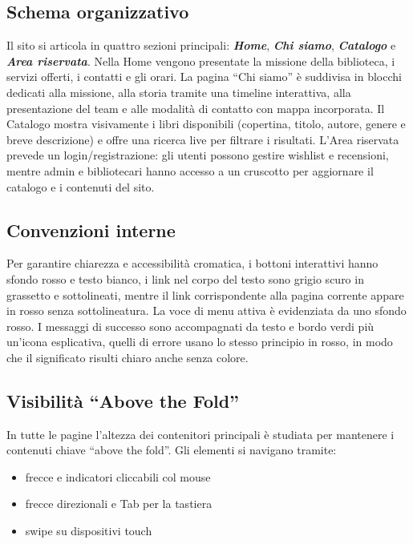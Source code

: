 \documentclass{article}
\begin{document}
\subsection{Schema organizzativo}
Il sito si articola in quattro sezioni principali: \emph{\textbf{Home}}, \emph{\textbf{Chi siamo}}, \emph{\textbf{Catalogo}} e \emph{\textbf{Area riservata}}.  
Nella Home vengono presentate la missione della biblioteca, i servizi offerti, i contatti e gli orari.  
La pagina “Chi siamo” è suddivisa in blocchi dedicati alla missione, alla storia tramite una timeline interattiva, alla presentazione del team e alle modalità di contatto con mappa incorporata.  
Il Catalogo mostra visivamente i libri disponibili (copertina, titolo, autore, genere e breve descrizione) e offre una ricerca live per filtrare i risultati.  
L’Area riservata prevede un login/registrazione: gli utenti possono gestire wishlist e recensioni, mentre admin e bibliotecari hanno accesso a un cruscotto per aggiornare il catalogo e i contenuti del sito.

\subsection{Convenzioni interne}
Per garantire chiarezza e accessibilità cromatica, i bottoni interattivi hanno sfondo rosso e testo bianco, i link nel corpo del testo sono grigio scuro in grassetto e sottolineati, mentre il link corrispondente alla pagina corrente appare in rosso senza sottolineatura. La voce di menu attiva è evidenziata da uno sfondo rosso. I messaggi di successo sono accompagnati da testo e bordo verdi più un’icona esplicativa, quelli di errore usano lo stesso principio in rosso, in modo che il significato risulti chiaro anche senza colore.

\subsection{Visibilità “Above the Fold”}
In tutte le pagine l’altezza dei contenitori principali è studiata per mantenere i contenuti chiave “above the fold”. Gli elementi si navigano tramite:
\begin{itemize}
  \item frecce e indicatori cliccabili col mouse  
  \item frecce direzionali e Tab per la tastiera  
  \item swipe su dispositivi touch  
\end{itemize}


\newpage
\end{document}
